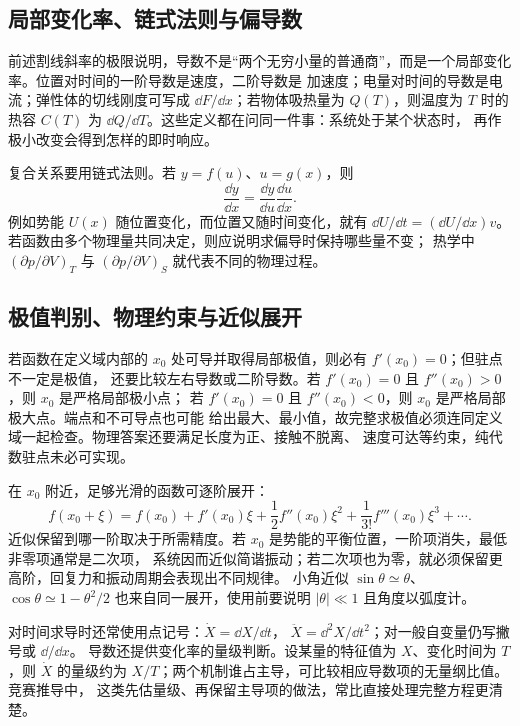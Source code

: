 \subsection{局部变化率、链式法则与偏导数}

前述割线斜率的极限说明，导数不是“两个无穷小量的普通商”，而是一个局部变化率。位置对时间的一阶导数是速度，二阶导数是
加速度；电量对时间的导数是电流；弹性体的切线刚度可写成 $\dd F/\dd x$；若物体吸热量为
$Q(T)$，则温度为 $T$ 时的热容 $C(T)$ 为 $\dd Q/\dd T$。这些定义都在问同一件事：系统处于某个状态时，
再作极小改变会得到怎样的即时响应。

复合关系要用链式法则。若 $y=f(u)$、$u=g(x)$，则
\[
 \frac{\dd y}{\dd x}=\frac{\dd y}{\dd u}\frac{\dd u}{\dd x}.
\]
例如势能 $U(x)$ 随位置变化，而位置又随时间变化，就有
$\dd U/\dd t=(\dd U/\dd x)v$。若函数由多个物理量共同决定，则应说明求偏导时保持哪些量不变；
热学中 $(\partial p/\partial V)_T$ 与 $(\partial p/\partial V)_S$ 就代表不同的物理过程。

\subsection{极值判别、物理约束与近似展开}

若函数在定义域内部的 $x_0$ 处可导并取得局部极值，则必有 $f'(x_0)=0$；但驻点不一定是极值，
还要比较左右导数或二阶导数。若 $f'(x_0)=0$ 且 $f''(x_0)>0$，则 $x_0$ 是严格局部极小点；
若 $f'(x_0)=0$ 且 $f''(x_0)<0$，则 $x_0$ 是严格局部极大点。端点和不可导点也可能
给出最大、最小值，故完整求极值必须连同定义域一起检查。物理答案还要满足长度为正、接触不脱离、
速度可达等约束，纯代数驻点未必可实现。

在 $x_0$ 附近，足够光滑的函数可逐阶展开：
\[
 f(x_0+\xi)=f(x_0)+f'(x_0)\xi+
 \frac12f''(x_0)\xi^2+\frac1{3!}f'''(x_0)\xi^3+\cdots .
\]
近似保留到哪一阶取决于所需精度。若 $x_0$ 是势能的平衡位置，一阶项消失，最低非零项通常是二次项，
系统因而近似简谐振动；若二次项也为零，就必须保留更高阶，回复力和振动周期会表现出不同规律。
小角近似 $\sin\theta\simeq\theta$、$\cos\theta\simeq1-\theta^2/2$ 也来自同一展开，使用前要说明
$|\theta|\ll1$ 且角度以弧度计。

对时间求导时还常使用点记号：$\dot X=\dd X/\dd t$，
$\ddot X=\dd^2X/\dd t^2$；对一般自变量仍写撇号或 $\dd/\dd x$。
导数还提供变化率的量级判断。设某量的特征值为 $X$、变化时间为 $T$，则
$\dot X$ 的量级约为 $X/T$；两个机制谁占主导，可比较相应导数项的无量纲比值。竞赛推导中，
这类先估量级、再保留主导项的做法，常比直接处理完整方程更清楚。
